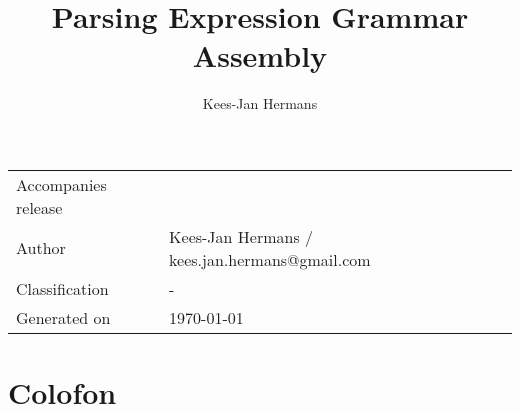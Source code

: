 \documentclass[11pt]{amsart}
\title{Parsing Expression Grammar Assembly}
\author{Kees-Jan Hermans}
\begin{document}
\maketitle



\vspace*{3\baselineskip}


\vfill

\begin{table}[]
\centering
\begin{tabular}{ll}
Accompanies release &  \\
Author &  Kees-Jan Hermans / kees.jan.hermans@gmail.com \\
Classification & - \\
Generated on & \today \\
\end{tabular}
\end{table}

\newpage

\tableofcontents

\setlength{\parindent}{4em}
\setlength{\parskip}{1em}

\newpage



\newpage
\section{Colofon}

\listoftables

\newpage


\end{document}
